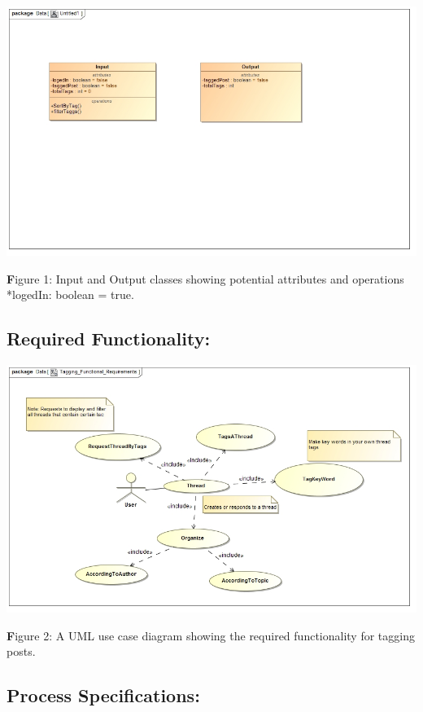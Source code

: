 \documentclass[a4paper,11pt]{article}
\begin{document}
\begin{center}
\includegraphics[width=0.9\linewidth]{Images/SocialTagging/Tag_Input_Output_ClassDiagram}
\end{center}

\textbf Figure 1: Input and Output classes showing potential attributes and operations *logedIn: boolean = true.

\subsection{Required Functionality:} 
\begin{center}
\includegraphics[width=0.9\linewidth]{Images/SocialTagging/Tagging_Functional_Requirements}
\end{center}

\textbf Figure 2: A UML use case diagram showing the required functionality for tagging posts.

\subsection{Process Specifications:} 
\end{document}
